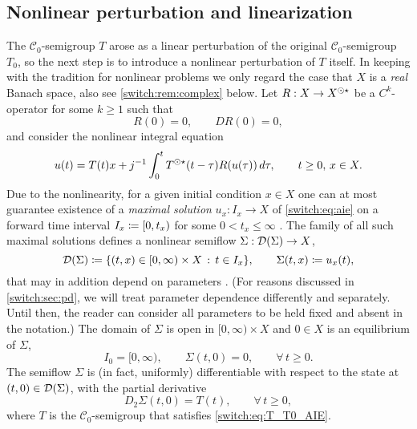 \subsection{Nonlinear perturbation and linearization}\label{switch:sec:nonlinear}
The $\mathcal{C}_0$-semigroup $T$ arose as a linear perturbation of the original $\mathcal{C}_0$-semigroup $T_0$, so the next step is to introduce a nonlinear perturbation of $T$ itself. In keeping with the tradition for nonlinear problems \cite[Sections VII.1 and VIII.1]{diekmann1995delay} we only regard the case that $X$ is a \emph{real} Banach space, also see \cref{switch:rem:complex} below. Let $R : X \to X^{\odot\star}$ be a $C^k$-operator for some $k \ge 1$ such that
\[
  R(0) = 0, \qquad DR(0) = 0,
\]
and consider the nonlinear integral equation
\begin{equation}%
  \label{switch:eq:aie}
  u(t) = T(t)x + j^{-1} \int_{0}^{t}\SUNSTAR{T}(t-\tau)R(u(\tau))\,d\tau, \qquad t \ge 0,\, x \in X.
\end{equation}
Due to the nonlinearity, for a given initial condition $x \in X$ one can at most guarantee existence of a \emph{maximal solution} $u_x : I_x \to X$ of \cref{switch:eq:aie} on a forward time interval $I_x \coloneqq [0,t_x)$ for some $0 < t_x \le \infty$ \cite[Chapter VII]{diekmann1995delay}. The family of all such maximal solutions defines a nonlinear semiflow $\Sigma : \mathcal{D}(\Sigma) \to X$,
%
\
\begin{equation}
  \label{switch:eq:semiflow}
  \mathcal{D}(\Sigma) \coloneqq \{(t,x) \in [0,\infty) \times X\,:\, t \in I_x\}, \qquad \Sigma(t, x) \coloneqq u_x(t),
\end{equation}
%
that may in addition depend on parameters \cite[Defs. VII.2.1 and VII.2.9]{diekmann1995delay}. (For reasons discussed in \cref{switch:sec:pd}, we will treat parameter dependence differently and separately. Until then, the reader can consider all parameters to be held fixed and absent in the notation.) The domain of $\Sigma$ is open in $[0,\infty) \times X$ and $0 \in X$ is an equilibrium of $\Sigma$,
\[
  I_0 = [0,\infty), \qquad \Sigma(t,0) = 0, \qquad \forall\,t \ge 0.
\]
The semiflow $\Sigma$ is (in fact, uniformly) differentiable with respect to the state at $(t,0) \in \mathcal{D}(\Sigma)$, with the partial derivative
\begin{equation}\label{switch:eq:linsigma}
D_2\Sigma(t,0) = T(t), \qquad \forall\,t \ge 0,
\end{equation}
where $T$ is the $\mathcal{C}_0$-semigroup that satisfies \cref{switch:eq:T_T0_AIE}.

